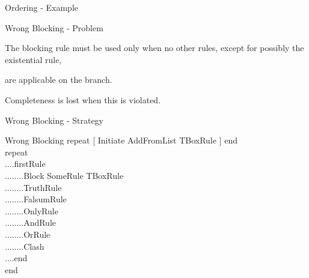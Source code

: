 \documentclass{beamer}
\begin{document}
\begin{frame}{Ordering - Example}

\begin{table}[h]
\begin{center}


\end{center}
\end{table}

\end{frame}




\begin{frame}{Wrong Blocking - Problem}

The blocking rule must be used only when no other rules, except for possibly the existential rule, 

are applicable on the branch.

Completeness is lost when this is violated.

\end{frame}

\begin{frame}{Wrong Blocking - Strategy}

\begin{block}{Wrong Blocking}
repeat [ Initiate AddFromList TBoxRule ] end\\
repeat\\
....firstRule\\
\alert<1>{........Block SomeRule TBoxRule\\}
........TruthRule\\
........FalsumRule\\
........OnlyRule\\
........AndRule\\
........OrRule\\
........Clash\\
....end\\
end
\end{block}

\end{frame}
\end{document}
